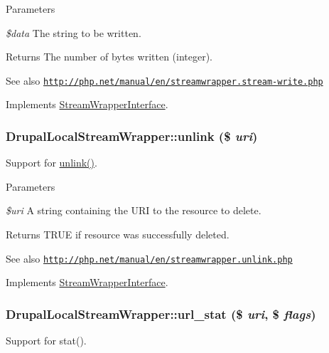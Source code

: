 \begin{DoxyParams}{Parameters}
\item[{\em \$data}]The string to be written.\end{DoxyParams}
\begin{DoxyReturn}{Returns}
The number of bytes written (integer).
\end{DoxyReturn}
\begin{DoxySeeAlso}{See also}
\href{http://php.net/manual/en/streamwrapper.stream-write.php}{\tt http://php.net/manual/en/streamwrapper.stream-\/write.php} 
\end{DoxySeeAlso}


Implements \hyperlink{interfaceStreamWrapperInterface}{StreamWrapperInterface}.\hypertarget{classDrupalLocalStreamWrapper_af40b6f2725d9df2029ecac8b6e25dab8}{
\subsubsection[{unlink}]{\setlength{\rightskip}{0pt plus 5cm}DrupalLocalStreamWrapper::unlink (\$ {\em uri})}}
\label{classDrupalLocalStreamWrapper_af40b6f2725d9df2029ecac8b6e25dab8}
Support for \hyperlink{classDrupalLocalStreamWrapper_af40b6f2725d9df2029ecac8b6e25dab8}{unlink()}.


\begin{DoxyParams}{Parameters}
\item[{\em \$uri}]A string containing the URI to the resource to delete.\end{DoxyParams}
\begin{DoxyReturn}{Returns}
TRUE if resource was successfully deleted.
\end{DoxyReturn}
\begin{DoxySeeAlso}{See also}
\href{http://php.net/manual/en/streamwrapper.unlink.php}{\tt http://php.net/manual/en/streamwrapper.unlink.php} 
\end{DoxySeeAlso}


Implements \hyperlink{interfaceStreamWrapperInterface}{StreamWrapperInterface}.\hypertarget{classDrupalLocalStreamWrapper_ac41bed06ba3f0959a9ef03130cf0f8fd}{
\subsubsection[{url\_\-stat}]{\setlength{\rightskip}{0pt plus 5cm}DrupalLocalStreamWrapper::url\_\-stat (\$ {\em uri}, \/  \$ {\em flags})}}
\label{classDrupalLocalStreamWrapper_ac41bed06ba3f0959a9ef03130cf0f8fd}
Support for stat().


